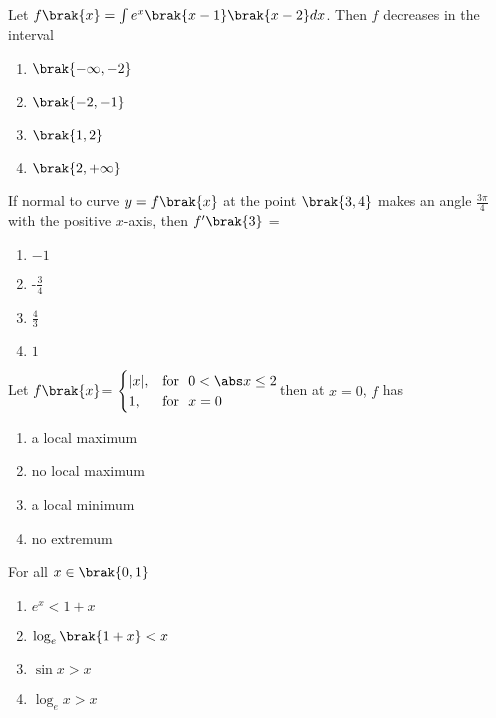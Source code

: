 \item Let $f\brak{x}=\int e^x\brak{x-1}\brak{x-2}dx$. Then $f$ decreases in the interval 
\hfill {}
\begin{multicols}{2}
\begin{enumerate}
    \item $\brak{-\infty,-2}$
    \item $\brak{-2,-1}$
    \item $\brak{1,2}$
    \item $\brak{2,+\infty}$
\end{enumerate}
\end{multicols}
\item If normal to curve $y=f\brak{x}$ at the point $\brak{3,4}$ makes an angle $\frac{3\pi}{4}$ with the positive $x$-axis, then $f^{\prime}\brak{3}$ = \hfill{}
\begin{multicols}{2}
\begin{enumerate}
    \item $-1$
    \item -$\frac{3}{4}$
    \item $\frac{4}{3}$
    \item $1$
\end{enumerate}
\end{multicols}
\item Let $f\brak{x}$=
$\begin{cases}
|x|, & \text{for } \ 0< \abs x \leq 2\\ 
1, & \text{for }\  x=0
\end{cases}$then at $x=0$, $f$ has
\hfill {}
\begin{multicols}{2}
\begin{enumerate}
    \item a local maximum
    \item no local maximum
    \item a local minimum
    \item no extremum
\end{enumerate}
\end{multicols}
\item For all $x\in\brak{0,1}$
\hfill {}
\begin{multicols}{2}
\begin{enumerate}
    \item $e^{x} <1+x$
    \item $\log_e{\brak{1+x}} < x$
    \item $ \sin{x} > x$
    \item $ \log_e{x} > x $
\end{enumerate}
\end{multicols}
